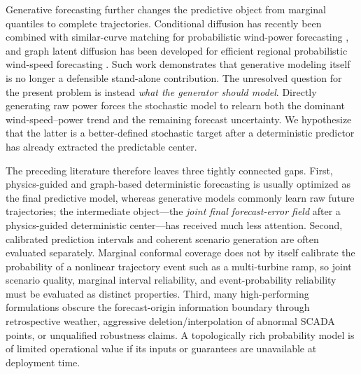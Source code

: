 \documentclass[journal]{IEEEtran}
\newcommand{\1}{\mathbb{I}}
\begin{document}
Generative forecasting further changes the predictive object from marginal quantiles to complete trajectories. Conditional diffusion has recently been combined with similar-curve matching for probabilistic wind-power forecasting \cite{gao2026diffusion}, and graph latent diffusion has been developed for efficient regional probabilistic wind-speed forecasting \cite{ma2026stgld}. Such work demonstrates that generative modeling itself is no longer a defensible stand-alone contribution. The unresolved question for the present problem is instead \emph{what the generator should model}. Directly generating raw power forces the stochastic model to relearn both the dominant wind-speed--power trend and the remaining forecast uncertainty. We hypothesize that the latter is a better-defined stochastic target after a deterministic predictor has already extracted the predictable center.

The preceding literature therefore leaves three tightly connected gaps. First, physics-guided and graph-based deterministic forecasting is usually optimized as the final predictive model, whereas generative models commonly learn raw future trajectories; the intermediate object---the \emph{joint final forecast-error field} after a physics-guided deterministic center---has received much less attention. Second, calibrated prediction intervals and coherent scenario generation are often evaluated separately. Marginal conformal coverage does not by itself calibrate the probability of a nonlinear trajectory event such as a multi-turbine ramp, so joint scenario quality, marginal interval reliability, and event-probability reliability must be evaluated as distinct properties. Third, many high-performing formulations obscure the forecast-origin information boundary through retrospective weather, aggressive deletion/interpolation of abnormal SCADA points, or unqualified robustness claims. A topologically rich probability model is of limited operational value if its inputs or guarantees are unavailable at deployment time.
\end{document}
